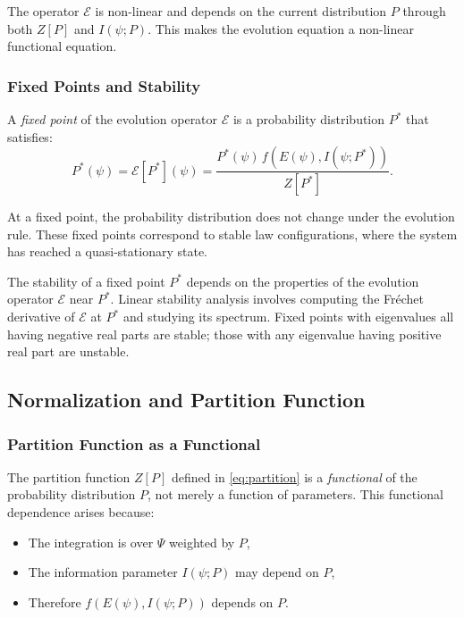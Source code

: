 \documentclass[12pt,a4paper]{article}
\theoremstyle{definition}
\theoremstyle{remark}
\begin{document}
The operator $\mathcal{E}$ is non-linear and depends on the current distribution $P$ through both $Z[P]$ and $I(\psi; P)$. This makes the evolution equation a non-linear functional equation.

\subsubsection{Fixed Points and Stability}

A \emph{fixed point} of the evolution operator $\mathcal{E}$ is a probability distribution $P^*$ that satisfies:
\begin{equation}\label{eq:fixed_point}
P^*(\psi) = \mathcal{E}[P^*](\psi) = \frac{P^*(\psi) \, f(E(\psi), I(\psi; P^*))}{Z[P^*]}.
\end{equation}

At a fixed point, the probability distribution does not change under the evolution rule. These fixed points correspond to stable law configurations, where the system has reached a quasi-stationary state.

The stability of a fixed point $P^*$ depends on the properties of the evolution operator $\mathcal{E}$ near $P^*$. Linear stability analysis involves computing the Fréchet derivative of $\mathcal{E}$ at $P^*$ and studying its spectrum. Fixed points with eigenvalues all having negative real parts are stable; those with any eigenvalue having positive real part are unstable.

\subsection{Normalization and Partition Function}

\subsubsection{Partition Function as a Functional}

The partition function $Z[P]$ defined in \eqref{eq:partition} is a \emph{functional} of the probability distribution $P$, not merely a function of parameters. This functional dependence arises because:
\begin{itemize}
\item The integration is over $\Psi$ weighted by $P$,
\item The information parameter $I(\psi; P)$ may depend on $P$,
\item Therefore $f(E(\psi), I(\psi; P))$ depends on $P$.
\end{itemize}
\end{document}
